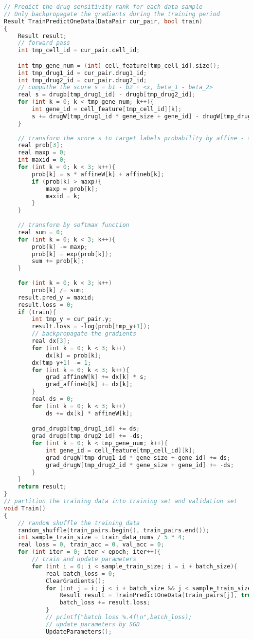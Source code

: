 \documentclass{article}
\begin{document}
\begin{lstlisting}[language=c++]
// Predict the drug sensitivity rank for each data sample
// Only backpropagate the gradients during the training period
Result TrainPredictOneData(DataPair cur_pair, bool train)
{
    Result result;
    // forward pass
    int tmp_cell_id = cur_pair.cell_id;

    int tmp_gene_num = (int) cell_feature[tmp_cell_id].size();
    int tmp_drug1_id = cur_pair.drug1_id;
    int tmp_drug2_id = cur_pair.drug2_id;
    // computhe the score s = b1 - b2 + <x, beta_1 - beta_2>
    real s = drugb[tmp_drug1_id] - drugb[tmp_drug2_id];
    for (int k = 0; k < tmp_gene_num; k++){
        int gene_id = cell_feature[tmp_cell_id][k];
        s += drugW[tmp_drug1_id * gene_size + gene_id] - drugW[tmp_drug2_id * gene_size + gene_id];
    }
    
    // transform the score s to target labels probability by affine - softmax layers
    real prob[3];
    real maxp = 0;
    int maxid = 0;
    for (int k = 0; k < 3; k++){
        prob[k] = s * affineW[k] + affineb[k];
        if (prob[k] > maxp){
            maxp = prob[k];
            maxid = k;
        }
    }
    
    // transform by softmax function
    real sum = 0;
    for (int k = 0; k < 3; k++){
        prob[k] -= maxp;
        prob[k] = exp(prob[k]);
        sum += prob[k];
    }
    
    for (int k = 0; k < 3; k++)
        prob[k] /= sum;
    result.pred_y = maxid;
    result.loss = 0;
    if (train){
        int tmp_y = cur_pair.y;
        result.loss = -log(prob[tmp_y+1]);
        // backpropagate the gradients
        real dx[3];
        for (int k = 0; k < 3; k++)
            dx[k] = prob[k];
        dx[tmp_y+1] -= 1;
        for (int k = 0; k < 3; k++){
            grad_affineW[k] += dx[k] * s;
            grad_affineb[k] += dx[k];
        }
        real ds = 0;
        for (int k = 0; k < 3; k++)
            ds += dx[k] * affineW[k];

        grad_drugb[tmp_drug1_id] += ds;
        grad_drugb[tmp_drug2_id] += -ds;
        for (int k = 0; k < tmp_gene_num; k++){
            int gene_id = cell_feature[tmp_cell_id][k];
            grad_drugW[tmp_drug1_id * gene_size + gene_id] += ds;
            grad_drugW[tmp_drug2_id * gene_size + gene_id] += -ds;
        }
    }
    return result;
}
// partition the training data into training set and validation set
void Train()
{
    // random shuffle the training data
    random_shuffle(train_pairs.begin(), train_pairs.end());
    int sample_train_size = train_data_nums / 5 * 4;
    real loss = 0, train_acc = 0, val_acc = 0;
    for (int iter = 0; iter < epoch; iter++){
        // train and update parameters
        for (int i = 0; i < sample_train_size; i = i + batch_size){
            real batch_loss = 0;
            ClearGradients();
            for (int j = i; j < i + batch_size && j < sample_train_size; j++){
                Result result = TrainPredictOneData(train_pairs[j], true);
                batch_loss += result.loss;
            }
            // printf("batch loss %.4f\n",batch_loss);
            // update parameters by SGD
            UpdateParameters();
            

\end{lstlisting}
\end{document}
